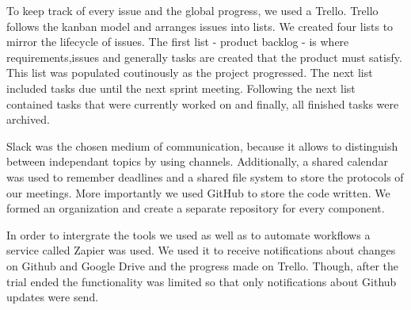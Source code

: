 To keep track of every issue and the global progress, we used a Trello.
Trello follows the kanban model and arranges issues into lists. We
created four lists to mirror the lifecycle of issues. The first list -
product backlog - is where requirements,issues and generally tasks are
created that the product must satisfy. This list was populated
coutinously as the project progressed. The next list included tasks due
until the next sprint meeting. Following the next list contained tasks
that were currently worked on and finally, all finished tasks were
archived.

Slack was the chosen medium of communication, because it allows to
distinguish between independant topics by using channels. Additionally,
a shared calendar was used to remember deadlines and a shared file
system to store the protocols of our meetings. More importantly we used
GitHub to store the code written. We formed an organization and create a
separate repository for every component.

In order to intergrate the tools we used as well as to automate
workflows a service called Zapier was used. We used it to receive
notifications about changes on Github and Google Drive and the progress
made on Trello. Though, after the trial ended the functionality was
limited so that only notifications about Github updates were send.
